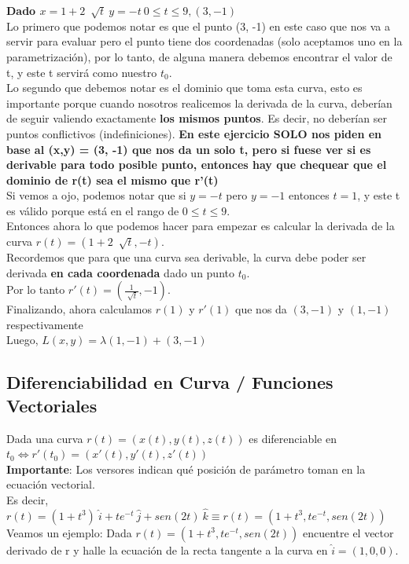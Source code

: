 \documentclass[10pt,a4paper]{article}
\begin{document}
\textbf{Dado $x=1+2 \ \sqrt[]{t} \ y = -t \ 0 \le t \le 9, (3, -1)$} \\
Lo primero que podemos notar es que el punto (3, -1) en este caso que nos va a servir para evaluar pero el punto tiene dos coordenadas (solo aceptamos uno en la parametrización), por lo tanto, de alguna manera debemos encontrar el valor de t, y este t servirá como nuestro $t_{0}$. \\
Lo segundo que debemos notar es el dominio que toma esta curva, esto es importante porque cuando nosotros realicemos la derivada de la curva, deberían de seguir valiendo exactamente \textbf{los mismos puntos}. Es decir, no deberían ser puntos conflictivos (indefiniciones). \textbf{En este ejercicio SOLO nos piden en base al (x,y) = (3, -1) que nos da un solo t, pero si fuese ver si es derivable para todo posible punto, entonces hay que chequear que el dominio de r(t) sea el mismo que r'(t)}\\
Si vemos a ojo, podemos notar que si $y = -t$ pero $y = -1$ entonces $t=1$, y este t es válido porque está en el rango de $0 \le t \le 9$. \\
Entonces ahora lo que podemos hacer para empezar es calcular la derivada de la curva $r(t) = (1+2 \ \sqrt[]{t}, -t)$. \\
Recordemos que para que una curva sea derivable, la curva debe poder ser derivada \textbf{en cada coordenada} dado un punto $t_{0}$. \\
Por lo tanto $r'(t) = (\frac{1}{\sqrt[]{t}}, -1)$. \\
Finalizando, ahora calculamos $r(1)$ y $r'(1)$ que nos da $(3, -1)$ y $(1, -1)$ respectivamente \\
Luego, $L (x,y) = \lambda (1, -1) + (3, -1)$
\subsection*{Diferenciabilidad en Curva / Funciones Vectoriales}
Dada una curva $r(t) = (x(t), y(t), z(t))$ es diferenciable en $t_{0} \iff r'(t_{0}) = (x'(t), y'(t), z'(t))$  \\

\textbf{Importante}: Los versores indican qué posición de parámetro toman en la ecuación vectorial. \\

Es decir, $r(t) = (1+t^{3}) \ \hat{i} + te^{-t} \ \hat{j} + sen(2t) \ \hat{k} \equiv r(t) = (1+t^{3}, te^{-t}, sen(2t))$ \\
Veamos un ejemplo: Dada $r(t) = (1+t^{3}, te^{-t}, sen(2t))$ encuentre el vector derivado de r y halle la ecuación de la recta tangente a la curva en $\hat{i} = (1, 0, 0)$. \\
\end{document}
